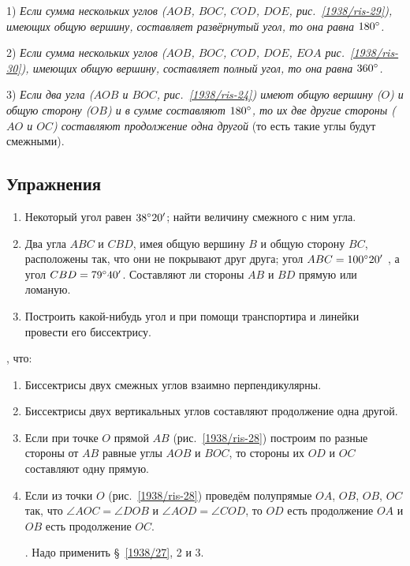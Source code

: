 1) \emph{Если сумма нескольких углов ($AOB$, $BOC$, $COD$, $DOE$, рис.~\ref{1938/ris-29}), имеющих общую вершину, составляет развёрнутый угол, то она равна $180\degree$.}

2) \emph{Если сумма нескольких углов ($AOB$, $BOC$, $COD$, $DOE$, $EOA$ рис.~\ref{1938/ris-30}), имеющих общую вершину, составляет полный угол, то она равна  $360\degree$.}

3) \emph{Если два угла ($AOB$ и $BOC$, рис.~\ref{1938/ris-24}) имеют общую вершину ($O$) и общую сторону ($OB$) и в сумме составляют $180\degree$, то их две другие стороны ($AO$ и $OC$) составляют продолжение одна другой} (то есть такие углы будут смежными).


{\small

\subsection*{Упражнения}


\begin{enumerate}[noitemsep]
\item
Некоторый угол равен $38\degree 20'$;
найти величину смежного с ним угла.

\item
Два угла $ABC$ и $CBD$, имея общую вершину $B$ и общую сторону $BC$, расположены так, что они не покрывают друг друга;
угол $ABC \z= 100\degree20'$ , а угол $CBD = 79\degree 40'$.
Составляют ли стороны $AB$ и $BD$ прямую или ломаную.

\item
Построить какой-нибудь угол и при помощи транспортира и линейки провести его биссектрису.

\end{enumerate}

\smallskip
{}, что:

\begin{enumerate}
\item
Биссектрисы двух смежных углов взаимно перпендикулярны.

\item
Биссектрисы двух вертикальных углов составляют продолжение одна другой.

\item
Если при точке $O$ прямой $AB$ (рис.~\ref{1938/ris-28}) построим по разные стороны от $AB$ равные углы $AOB$ и $BOC$, то стороны их $OD$ и $OC$ составляют одну прямую.

\item
Если из точки $O$ (рис.~\ref{1938/ris-28}) проведём полупрямые $OA$, $OB$, $OB$, $OC$ так, что $\angle AOC = \angle DOB$ и $\angle AOD=\angle COD$, то $OD$ есть продолжение $OA$ и $OB$ есть продолжение $OC$.

\smallskip
{}.
Надо применить §~\ref{1938/27}, 2 и 3.

\end{enumerate}

}

